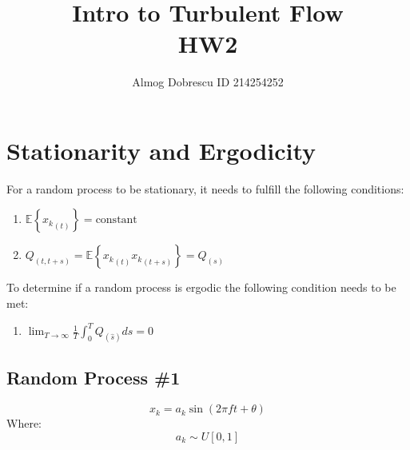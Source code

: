 \documentclass[11pt, a4paper]{article}
\title{Intro to Turbulent Flow \\ HW2}
\author{Almog Dobrescu ID 214254252}
\begin{document}
\thispagestyle{empty}
\maketitle
\newpage


\tableofcontents
\vfil
\listoffigures
\vfil
\lstlistoflistings
\newpage

\printnomenclature
\newpage

\pagestyle{fancy}
\setcounter{page}{1}

\section{Stationarity and Ergodicity}
For a random process to be stationary, it needs to fulfill the following conditions:
\begin{enumerate}
    \item $\displaystyle\mathbb{E}{\left\{{x_k}_{\left(t\right)}\right\}}=\text{constant}$
    \item $\displaystyle Q_{\left(t,t+s\right)}=\mathbb{E}\left\{{x_k}_{\left(t\right)}{x_k}_{\left(t+s\right)}\right\}=Q_{\left(s\right)}$
\end{enumerate}
To determine if a random process is ergodic the following condition needs to be met:
\begin{enumerate}
    \item $\displaystyle\lim_{T\rightarrow\infty}\frac{1}{T}\int_{0}^{T}{Q_{\left(\hat{s}\right)}d\hat{s}}=0$
\end{enumerate}
\subsection{Random Process \#1}
\begin{equation}
    x_k=a_k\sin{\left(2\pi ft+\theta\right)}
\end{equation}
Where:
\begin{equation}
    a_k\sim U\left[0,1\right]
\end{equation}
\end{document}
